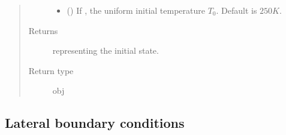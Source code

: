 \documentclass[letterpaper,10pt,english]{sphinxmanual}
\begin{document}
\begin{fulllineitems}
\begin{fulllineitems}
\begin{quote}
\begin{description}
\begin{itemize}
\item {} 
 () \textendash{} If , the uniform initial temperature \(T_0\). Default is \(250 K\).

\end{itemize}

\item[{Returns}] \leavevmode
{\hyperref[\detokenize{api:storages.state_isentropic.StateIsentropic}]{}} representing the initial state.

\item[{Return type}] \leavevmode
obj

\end{description}\end{quote}

\end{fulllineitems}


\end{fulllineitems}



\subsection{Lateral boundary conditions}
\label{\detokenize{api:lateral-boundary-conditions}}
\end{document}
